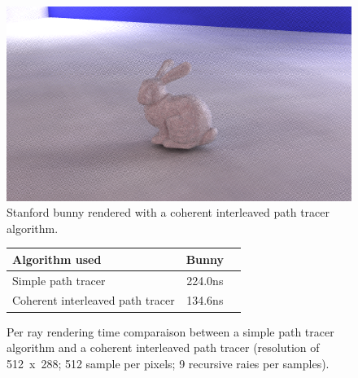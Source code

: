 
\begin{figure}[h]
    \centering
    \includegraphics[width=0.8\columnwidth]{render_stanford_bunny.png}
    \caption{Stanford bunny rendered with a coherent interleaved path tracer algorithm.}
    \label{fig:stanford_bunny_cipt}
\end{figure}

\begin{figure}[H]
    \tiny
    \centering
    \begin{tabular}{ | l | c | c | }

        \hline
        Algorithm used & Bunny \\
        \hline
        Simple path tracer & 224.0ns \\
        Coherent interleaved path tracer & 134.6ns \\
        \hline

    \end{tabular}
    \caption{
        Per ray rendering time comparaison between a simple path tracer
        algorithm and a coherent interleaved path tracer (resolution of 512~x~288; 512
        sample per pixels; 9 recursive raies per samples).
    }
    \label{table:cipt_compare}
\end{figure}
